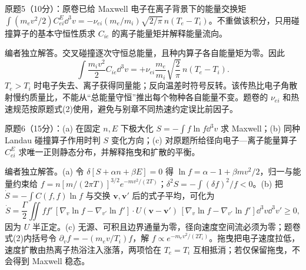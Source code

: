 \begin{exercise}\label{ex:hist02-final-5}
原题5（10分）：原卷已给 Maxwell 电子在离子背景下的能量交换矩 $\int(m_ev^2/2)C_{ei}^{E}\dd^3v=-\nu_{ei}(m_e/m_i)\sqrt{2/\pi}\,n(T_e-T_i)$。不重做该积分，只用碰撞算子的基本守恒性质求 $C_{ie}$ 的离子能量矩并解释能量流向。
\end{exercise}
\begin{solution}
编者独立解答。交叉碰撞逐次守恒总能量，且种内算子各自能量矩为零。因此
\begin{equation}\int\frac{m_iv^2}{2}C_{ie}\dd^3v=+\nu_{ei}\frac{m_e}{m_i}\sqrt{\frac2\pi}\,n(T_e-T_i).
\end{equation}
$T_e>T_i$ 时电子失去、离子获得同量能；反向温差时符号反转。该传热比电子角散射慢约质量比，不能从“总能量守恒”推出每个物种各自能量不变。题卷的 $\nu_{ei}$ 和热速规范按原题式(2)使用，避免与别章不同热速约定误比前因子。
\end{solution}

\begin{exercise}\label{ex:hist02-final-6}
原题6（15分）：(a) 在固定 $n,E$ 下极大化 $S=-\int f\ln f\dd^3v$ 求 Maxwell；(b) 同种 Landau 碰撞算子作用时判 $S$ 变化方向；(c) 对原题所给径向电子—离子能量算子 $C_{ei}^{E}$ 求唯一正则静态分布，并解释拖曳和扩散的平衡。
\end{exercise}
\begin{solution}
编者独立解答。(a) 令 $\delta[S+\alpha n+\beta E]=0$ 得 $\ln f=\alpha-1+\beta mv^2/2$，归一与能量约束给 $f=n[m/(2\pi T)]^{3/2}e^{-mv^2/(2T)}$；$\delta^2S=-\int(\delta f)^2/f<0$。(b) 把 $\dot S=-\int C(f,f)\ln f$ 与交换 $\mathbf v,\mathbf v'$ 后的式子平均，可化为
\begin{equation}\dot S=\frac\Gamma2\iint ff'\,[\nabla_v\ln f-\nabla_{v'}\ln f']\cdot U(\mathbf v-\mathbf v')\,[\nabla_v\ln f-\nabla_{v'}\ln f']\dd^3v\dd^3v'\ge0,
\end{equation}
因为 $U$ 半正定。(c) 无源、可积且边界通量为零，径向速度空间流必须为零；题卷式(2)内括号令 $\partial_v f=-(m_ev/T_i)f$，解 $f\propto e^{-m_ev^2/(2T_i)}$。拖曳把电子速度拉低，速度扩散由热离子热浴注入涨落，两项恰在 $T_e=T_i$ 互相抵消；若仅保留拖曳，不会得到 Maxwell 稳态。
\end{solution}
